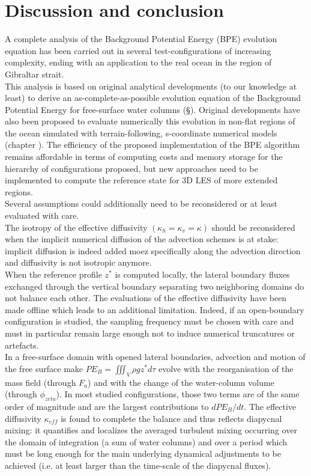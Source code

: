\section{Discussion and conclusion}
A complete analysis of the Background Potential Energy (BPE) evolution equation has been carried out in several test-configurations of increasing complexity, ending with an application to the real ocean in the region of Gibraltar strait.\\
This analysis is based on original analytical developments (to our knowledge at least) to derive an as-complete-as-possible evolution equation of the Background Potential Energy for free-surface water columns (\S {}). Original developments have also been proposed to evaluate numerically this evolution in non-flat regions of the ocean simulated with terrain-following, s-coordinate numerical models (chapter ). The efficiency of the proposed implementation of the BPE algorithm remains affordable in terms of computing costs and memory storage for the hierarchy of configurations proposed, but new approaches need to be implemented to compute the reference state \cite{saenz_estimating_2015} for 3D LES of more extended regions.\\
Several assumptions could additionally need to be reconsidered or at least evaluated with care.\\
The isotropy of the effective diffusivity $(\kappa_h=\kappa_v=\kappa)$ should be reconsidered when the implicit numerical diffusion of the advection schemes is at stake: implicit diffusion is indeed added moez specifically along the advection direction and diffusivity is not isotropic anymore.\\
When the reference profile $z^*$ is computed locally, the lateral boundary fluxes exchanged through the vertical boundary separating two neighboring domains do not balance each other. 
The evaluations of the effective diffusivity have been made offline which leads to an additional limitation. Indeed, if an open-boundary configuration is studied, the sampling frequency must be chosen with care and must in particular remain large enough not to induce numerical truncatures or artefacts.\\
In a free-surface domain with opened lateral boundaries, advection and motion of the free surface make $PE_B=\iiint_V \rho g z^* d\tau$ evolve with the reorganisation of the mass field (through $F_a$) and with the change of the water-column volume (through $\phi_{zeta}$). In most studied configurations, those two terms are of the same order of magnitude and are the largest contributions to $dPE_B/dt$. The effective diffusivity $\kappa_{eff}$ is found to complete the balance and thus reflects diapycnal mixing: it quantifies and localizes the averaged turbulent mixing occurring over the domain of integration (a sum of water columns) and over a period which must be long enough for the main underlying dynamical adjustments to be achieved (i.e. at least larger than the time-scale of the diapycnal fluxes).
